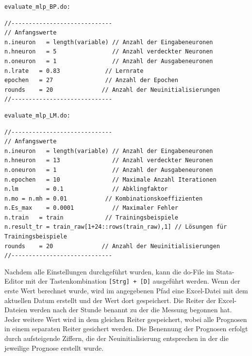 \begin{Verbatim}
evaluate_mlp_BP.do:
\end{Verbatim}
{
\begin{lstlisting}[firstnumber=318]
//-----------------------------
// Anfangswerte
n.ineuron	= length(variable) // Anzahl der Eingabeneuronen
n.hneuron	= 5                // Anzahl verdeckter Neuronen
n.oneuron	= 1                // Anzahl der Ausgabeneuronen
n.lrate   = 0.83             // Lernrate
epochen   = 27               // Anzahl der Epochen
rounds    = 20			    // Anzahl der Neuinitialisierungen
//-----------------------------
\end{lstlisting}
}

\begin{Verbatim}
evaluate_mlp_LM.do:
\end{Verbatim}
{
\begin{lstlisting}[firstnumber=318]
//-----------------------------
// Anfangswerte
n.ineuron	= length(variable) // Anzahl der Eingabeneuronen
n.hneuron	= 13               // Anzahl verdeckter Neuronen
n.oneuron	= 1                // Anzahl der Ausgabeneuronen
n.epochen	= 10               // Maximale Anzahl Iterationen
n.lm		= 0.1              // Abklingfaktor
n.mo = n.mh = 0.01           // Kombinationskoeffizienten
n.Es_max	= 0.0001           // Maximaler Fehler
n.train   = train            // Trainingsbeispiele
n.result_tr = train_raw[1+24::rows(train_raw),1] // Lösungen für Trainingsbeispiele
rounds    = 20			    // Anzahl der Neuinitialisierungen
//-----------------------------
\end{lstlisting}
}

Nachdem alle Einstellungen durchgeführt wurden, kann die do-File im Stata-Editor mit der Tastenkombination \verb|[Strg] + [D]| ausgeführt werden. Wenn der erste Wert berechnet wurde, wird im angegebenen Pfad eine Excel-Datei mit dem aktuellen Datum erstellt und der Wert dort gespeichert. Die Reiter der Excel-Dateien werden nach der Stunde benannt zu der die Messung begonnen hat. Jeder weitere Wert wird in dem gleichen Reiter gespeichert, wobei alle Prognosen in einem separaten Reiter gesichert werden. Die Benennung der Prognosen erfolgt durch aufsteigende Ziffern, die der Neuinitialisierung entsprechen in der die jeweilige Prognose erstellt wurde.